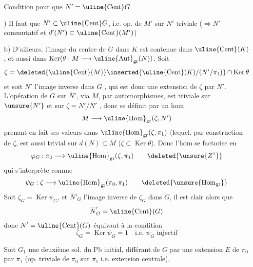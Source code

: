 
Condition pour que $N'=\uline{\operatorname{Cent}}G$

) Il faut que $N'\subset\uline{\operatorname{Cent}}G$, i.e. op.  de $M'$ sur $N'$
triviale ($\Longrightarrow N'$ commutatif et $d'(N')\subset\uline{\operatorname{Cent}}(M')$)

b) D'ailleurs, l'image du centre de $G$ dans $K$  est
contenue dans $\uline{\operatorname{Cent}}(K)$ , et aussi dans
$\operatorname{Ker}(\theta:M\longrightarrow\uline{\operatorname{Aut}}_{\mathrm{gr}}(N))$. Soit
\[
\zeta=\deleted{\uline{\operatorname{Cent}}(M)}\inserted{\uline{\operatorname{Cent}}(K)/(N'/\pi_1)}\cap\operatorname{Ker}\theta
\]
et soit $\overline{N}'$  l'image inverse dans $G$ ,
qui est donc
une extension de $\zeta$ par $N'$. L'opération de
$G$ sur $\overline{N}'$, via $M$, par automorphismes, est triviale
sur $\unsure{N'}$ et sur $\zeta=\overline{N}'/N'$ , donc se définit par un
hom
\[
M\longrightarrow\uline{\operatorname{Hom}}_{\mathrm{gr}}(\zeta,N')
\]
prenant en fait ses valeurs dans $\uline{\operatorname{Hom}}_{\mathrm{gr}}(\zeta,\pi_1)$
(lequel, par construction de $\zeta$, est aussi trivial
sur $d(N)\subset M$ ($\zeta\subset\operatorname{Ker}\theta$). Donc l'hom
se factorise en
\[
\varphi_G:\pi_0\longrightarrow\uline{\operatorname{Hom}}_{\mathrm{gr}}(\zeta,\pi_1)
\qquad\deleted{\unsure{Z^1}}
\]
qui s'interprète  comme
\[
\psi_G:\zeta\longrightarrow\uline{\operatorname{Hom}}_{\mathrm{gr}}(\pi_0,\pi_1)
\qquad\deleted{\unsure{\operatorname{Hom}_{\mathrm{gr}}}}
\]
Soit $\zeta_G=\operatorname{Ker}\psi_G$, et $\overline{N}'_G$ l'image inverse de
$\zeta_G$ dans $G$, il est clair alors que
\[
\overline{N}'_G=\uline{\operatorname{Cent}}(G)
\]
donc $N'=\uline{\operatorname{Cent}}(G)$ équivaut à la condition
\[
\boxed{\zeta_G=\operatorname{Ker}\psi_G=1\quad\text{i.e. }\psi_G\text{ injectif}}
\]

Soit $G_1$ une deuxième sol. du Pb initial,
différant de $G$ par une extension  $E$ de $\pi_0$ par $\pi_1$
(op. triviale de $\pi_0$ sur $\pi_1$ i.e. extension centrale),

